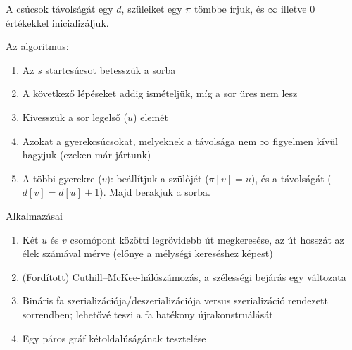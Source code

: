 \documentclass[margin=0px]{article}
\begin{document}
A csúcsok távolságát egy $d$, szüleiket egy $\pi$ tömbbe írjuk, és $\infty$ illetve $0$ értékekkel inicializáljuk.
\begin{flushleft}
Az algoritmus:
\end{flushleft}
\begin{enumerate}
    \item Az $s$ startcsúcsot betesszük a sorba
    \item A következő lépéseket addig ismételjük, míg a sor üres nem lesz
    \item Kivesszük a sor legelső ($u$) elemét
    \item Azokat a gyerekcsúcsokat, melyeknek a távolsága nem $\infty$ figyelmen kívül hagyjuk (ezeken már jártunk)
    \item A többi gyerekre ($v$): beállítjuk a szülőjét ($\pi[v] = u$), és a távolságát ($d[v] = d[u]+1$). Majd berakjuk a sorba.
\end{enumerate}
Alkalmazásai
\begin{enumerate}
	\item Két $u$ és $v$ csomópont közötti legrövidebb út megkeresése, az út hosszát az élek számával mérve (előnye a mélységi kereséshez képest)
	\item (Fordított) Cuthill–McKee-hálószámozás, a szélességi bejárás egy változata
	\item Bináris fa szerializációja/deszerializációja versus szerializáció rendezett sorrendben; lehetővé teszi a fa hatékony újrakonstruálását
	\item Egy páros gráf kétoldalúságának tesztelése
\end{enumerate}
\end{document}
